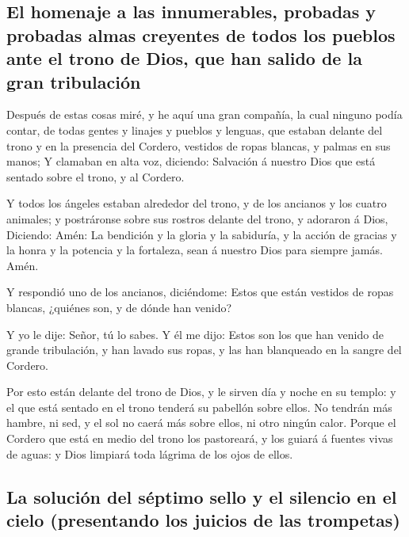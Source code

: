\hypertarget{el-homenaje-a-las-innumerables-probadas-y-probadas-almas-creyentes-de-todos-los-pueblos-ante-el-trono-de-dios-que-han-salido-de-la-gran-tribulaciuxf3n}{%
\subsection{El homenaje a las innumerables, probadas y probadas almas
creyentes de todos los pueblos ante el trono de Dios, que han salido de
la gran
tribulación}\label{el-homenaje-a-las-innumerables-probadas-y-probadas-almas-creyentes-de-todos-los-pueblos-ante-el-trono-de-dios-que-han-salido-de-la-gran-tribulaciuxf3n}}

 Después de estas cosas miré, y he aquí una gran compañía,
la cual ninguno podía contar, de todas gentes y linajes y pueblos y
lenguas, que estaban delante del trono y en la presencia del Cordero,
vestidos de ropas blancas, y palmas en sus manos;  Y
clamaban en alta voz, diciendo: Salvación á nuestro Dios que está
sentado sobre el trono, y al Cordero.

 Y todos los ángeles estaban alrededor del trono, y de los
ancianos y los cuatro animales; y postráronse sobre sus rostros delante
del trono, y adoraron á Dios,  Diciendo: Amén: La bendición
y la gloria y la sabiduría, y la acción de gracias y la honra y la
potencia y la fortaleza, sean á nuestro Dios para siempre jamás. Amén.

 Y respondió uno de los ancianos, diciéndome: Estos que
están vestidos de ropas blancas, ¿quiénes son, y de dónde han venido?

 Y yo le dije: Señor, tú lo sabes. Y él me dijo: Estos son
los que han venido de grande tribulación, y han lavado sus ropas, y las
han blanqueado en la sangre del Cordero.

 Por esto están delante del trono de Dios, y le sirven día
y noche en su templo: y el que está sentado en el trono tenderá su
pabellón sobre ellos.  No tendrán más hambre, ni sed, y el
sol no caerá más sobre ellos, ni otro ningún calor.  Porque
el Cordero que está en medio del trono los pastoreará, y los guiará á
fuentes vivas de aguas: y Dios limpiará toda lágrima de los ojos de
ellos.

\hypertarget{la-soluciuxf3n-del-suxe9ptimo-sello-y-el-silencio-en-el-cielo-presentando-los-juicios-de-las-trompetas}{%
\subsection{La solución del séptimo sello y el silencio en el cielo
(presentando los juicios de las
trompetas)}\label{la-soluciuxf3n-del-suxe9ptimo-sello-y-el-silencio-en-el-cielo-presentando-los-juicios-de-las-trompetas}}

